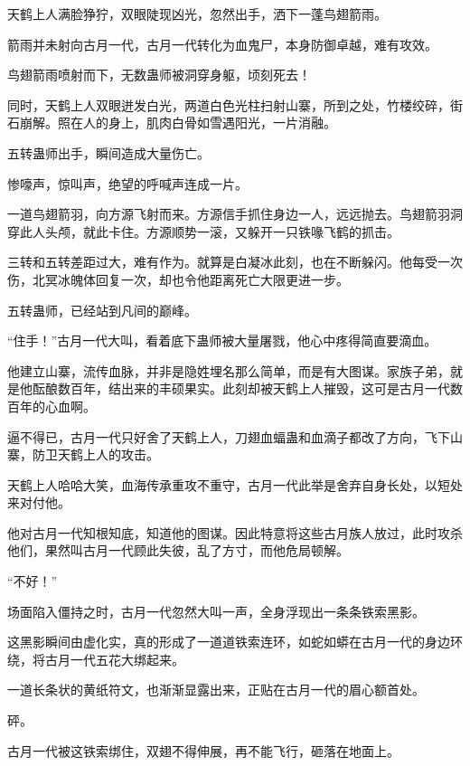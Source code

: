 
\begin{this_body}



天鹤上人满脸狰狞，双眼陡现凶光，忽然出手，洒下一蓬鸟翅箭雨。

箭雨并未射向古月一代，古月一代转化为血鬼尸，本身防御卓越，难有攻效。

鸟翅箭雨喷射而下，无数蛊师被洞穿身躯，顷刻死去！

同时，天鹤上人双眼迸发白光，两道白色光柱扫射山寨，所到之处，竹楼绞碎，街石崩解。照在人的身上，肌肉白骨如雪遇阳光，一片消融。

五转蛊师出手，瞬间造成大量伤亡。

惨嚎声，惊叫声，绝望的呼喊声连成一片。

一道鸟翅箭羽，向方源飞射而来。方源信手抓住身边一人，远远抛去。鸟翅箭羽洞穿此人头颅，就此卡住。方源顺势一滚，又躲开一只铁喙飞鹤的抓击。

三转和五转差距过大，难有作为。就算是白凝冰此刻，也在不断躲闪。他每受一次伤，北冥冰魄体回复一次，却也令他距离死亡大限更进一步。

五转蛊师，已经站到凡间的巅峰。

“住手！”古月一代大叫，看着底下蛊师被大量屠戮，他心中疼得简直要滴血。

他建立山寨，流传血脉，并非是隐姓埋名那么简单，而是有大图谋。家族子弟，就是他酝酿数百年，结出来的丰硕果实。此刻却被天鹤上人摧毁，这可是古月一代数百年的心血啊。

逼不得已，古月一代只好舍了天鹤上人，刀翅血蝠蛊和血滴子都改了方向，飞下山寨，防卫天鹤上人的攻击。

天鹤上人哈哈大笑，血海传承重攻不重守，古月一代此举是舍弃自身长处，以短处来对付他。

他对古月一代知根知底，知道他的图谋。因此特意将这些古月族人放过，此时攻杀他们，果然叫古月一代顾此失彼，乱了方寸，而他危局顿解。

“不好！”

场面陷入僵持之时，古月一代忽然大叫一声，全身浮现出一条条铁索黑影。

这黑影瞬间由虚化实，真的形成了一道道铁索连环，如蛇如蟒在古月一代的身边环绕，将古月一代五花大绑起来。

一道长条状的黄纸符文，也渐渐显露出来，正贴在古月一代的眉心额首处。

砰。

古月一代被这铁索绑住，双翅不得伸展，再不能飞行，砸落在地面上。


\end{this_body}
